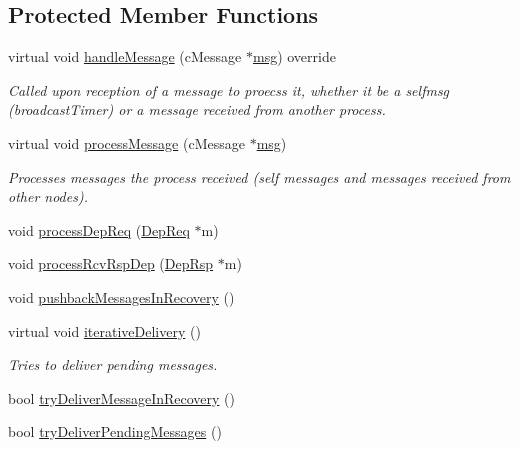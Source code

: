 \subsection*{Protected Member Functions}
\begin{DoxyCompactItemize}
\item 
virtual void \hyperlink{class_node_with_recovery_a901c89606b84898e13fe8a66228acd9f}{handle\+Message} (c\+Message $\ast$\hyperlink{_controller_8h_afa0f3b802fbc219228f7bb97996fa558}{msg}) override
\begin{DoxyCompactList}\small\item\em Called upon reception of a message to proecss it, whether it be a selfmsg (broadcast\+Timer) or a message received from another process. \end{DoxyCompactList}\item 
virtual void \hyperlink{class_node_with_recovery_a216c29d76ddb0e94cd5701ff208c7f5b}{process\+Message} (c\+Message $\ast$\hyperlink{_controller_8h_afa0f3b802fbc219228f7bb97996fa558}{msg})
\begin{DoxyCompactList}\small\item\em Processes messages the process received (self messages and messages received from other nodes). \end{DoxyCompactList}\item 
void \hyperlink{class_node_with_recovery_a52ef51093d41e9b337987810311a7bc6}{process\+Dep\+Req} (\hyperlink{class_dep_req}{Dep\+Req} $\ast$m)
\item 
void \hyperlink{class_node_with_recovery_a34b5b66f90d85dd84b237b8cf81f2f7e}{process\+Rcv\+Rsp\+Dep} (\hyperlink{class_dep_rsp}{Dep\+Rsp} $\ast$m)
\item 
void \hyperlink{class_node_with_recovery_a261e41c94a93113168f8f81411b7c100}{pushback\+Messages\+In\+Recovery} ()
\item 
virtual void \hyperlink{class_node_with_recovery_a9b61912f38b62452584dc80bf261ef4e}{iterative\+Delivery} ()
\begin{DoxyCompactList}\small\item\em Tries to deliver pending messages. \end{DoxyCompactList}\item 
bool \hyperlink{class_node_with_recovery_a87a1ce8071c9c587b878636f79163e7e}{try\+Deliver\+Message\+In\+Recovery} ()
\item 
bool \hyperlink{class_node_with_recovery_a462d825601a3c85ee4ef95be673790f8}{try\+Deliver\+Pending\+Messages} ()
\item 

\end{DoxyCompactItemize}
